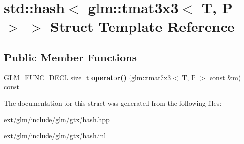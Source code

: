 \hypertarget{structstd_1_1hash_3_01glm_1_1tmat3x3_3_01_t_00_01_p_01_4_01_4}{\section{std\-:\-:hash$<$ glm\-:\-:tmat3x3$<$ T, P $>$ $>$ Struct Template Reference}
\label{structstd_1_1hash_3_01glm_1_1tmat3x3_3_01_t_00_01_p_01_4_01_4}
}
\subsection*{Public Member Functions}
\begin{DoxyCompactItemize}
\item 
\hypertarget{structstd_1_1hash_3_01glm_1_1tmat3x3_3_01_t_00_01_p_01_4_01_4_acb2913cd5ace97cf3af247177698bee4}{G\-L\-M\-\_\-\-F\-U\-N\-C\-\_\-\-D\-E\-C\-L size\-\_\-t {\bfseries operator()} (\hyperlink{structglm_1_1tmat3x3}{glm\-::tmat3x3}$<$ T, P $>$ const \&m) const }\label{structstd_1_1hash_3_01glm_1_1tmat3x3_3_01_t_00_01_p_01_4_01_4_acb2913cd5ace97cf3af247177698bee4}

\end{DoxyCompactItemize}


The documentation for this struct was generated from the following files\-:\begin{DoxyCompactItemize}
\item 
ext/glm/include/glm/gtx/\hyperlink{hash_8hpp}{hash.\-hpp}\item 
ext/glm/include/glm/gtx/\hyperlink{hash_8inl}{hash.\-inl}\end{DoxyCompactItemize}
